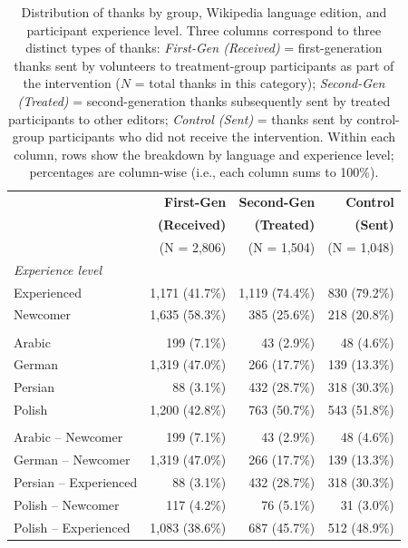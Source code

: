 \begin{table}[t]
\centering
\caption{Distribution of thanks by group, Wikipedia language edition, and participant experience level. Three columns correspond to three distinct types of thanks: \textit{First-Gen (Received)} = first-generation thanks sent by volunteers to treatment-group participants as part of the intervention ($N$ = total thanks in this category); \textit{Second-Gen (Treated)} = second-generation thanks subsequently sent by treated participants to other editors; \textit{Control (Sent)} = thanks sent by control-group participants who did not receive the intervention. Within each column, rows show the breakdown by language and experience level; percentages are column-wise (i.e., each column sums to 100\%).}
\label{table:thanks-distribution}
\begin{tabular}{lrrr}
\toprule
 & \textbf{First-Gen} & \textbf{Second-Gen} & \textbf{Control} \\
 & \textbf{(Received)} & \textbf{(Treated)} & \textbf{(Sent)} \\
 & (N = 2,806) & (N = 1,504) & (N = 1,048) \\
\midrule
\multicolumn{4}{l}{\textit{Experience level}} \\
\quad Experienced & 1,171 (41.7\%) & 1,119 (74.4\%) & 830 (79.2\%) \\
\quad Newcomer & 1,635 (58.3\%) & 385 (25.6\%) & 218 (20.8\%) \\
\addlinespace
\multicolumn{4}{l}{\textit{Language}} \\
\quad Arabic & 199 (7.1\%) & 43 (2.9\%) & 48 (4.6\%) \\
\quad German & 1,319 (47.0\%) & 266 (17.7\%) & 139 (13.3\%) \\
\quad Persian & 88 (3.1\%) & 432 (28.7\%) & 318 (30.3\%) \\
\quad Polish & 1,200 (42.8\%) & 763 (50.7\%) & 543 (51.8\%) \\
\addlinespace
\multicolumn{4}{l}{\textit{Language $\times$ Experience}} \\
\quad Arabic -- Newcomer & 199 (7.1\%) & 43 (2.9\%) & 48 (4.6\%) \\
\quad German -- Newcomer & 1,319 (47.0\%) & 266 (17.7\%) & 139 (13.3\%) \\
\quad Persian -- Experienced & 88 (3.1\%) & 432 (28.7\%) & 318 (30.3\%) \\
\quad Polish -- Newcomer & 117 (4.2\%) & 76 (5.1\%) & 31 (3.0\%) \\
\quad Polish -- Experienced & 1,083 (38.6\%) & 687 (45.7\%) & 512 (48.9\%) \\
\bottomrule
\end{tabular}
\end{table}
